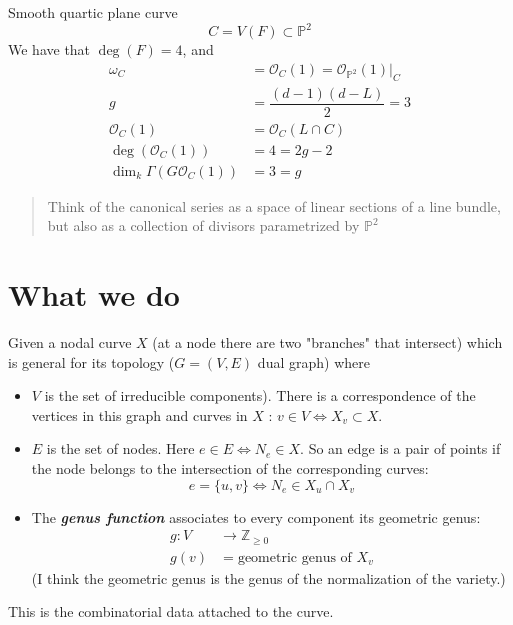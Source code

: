   \begin{example}
 	Smooth quartic plane curve
	\[C=V(F)\subset \mathbb{P}^2\]
	We have that $\operatorname{deg}(F)=4$, and
	\begin{align*}
		\omega_C&=\mathcal{O}_C(1)=\mathcal{O}_{\mathbb{P}^2}(1)|_{C}\\
		g&=\dfrac{(d-1)(d-L)}{2}=3\\
		\mathcal{O}_C(1)&=\mathcal{O}_C(L\cap C)\\
		\operatorname{deg}(\mathcal{O}_C(1))&=4=2g-2\\
		\dim_k\Gamma(G\mathcal{O}_C(1))&=3=g
	\end{align*}
 \end{example}
\begin{quotation}
	Think of the canonical series as a space of linear sections of a line bundle, but also as a collection of divisors parametrized by $\mathbb{P}^2$
\end{quotation}

\begin{example}
\end{example}

\section{What we do}
Given a nodal curve $X$ (at a node there are two "branches" that intersect) which is general for its topology ($G=(V,E)$ dual graph) where
 \begin{itemize}
\item $V$ is the set of irreducible components). There is a correspondence of the vertices in this graph and curves in $X$ : $v\in V\iff X_v \subset X$.
\item $E$ is the set of nodes. Here $e \in E\iff N_e\in X$. So an edge is a pair of points if the node belongs to the intersection of the corresponding curves:
	\[e=\{u,v\} \iff N_e\in X_u\cap X_v\]
\item The \textit{\textbf{genus function}} associates to every component its geometric genus:
	 \begin{align*}
		g: V &\longrightarrow \mathbb{Z}_{\geq 0} \\
		g(v) &=\text{geometric genus of }X_v  
	\end{align*}
	(I think the geometric genus is the genus of the normalization of the variety.)	
\end{itemize}
This is the combinatorial data attached to the curve.

